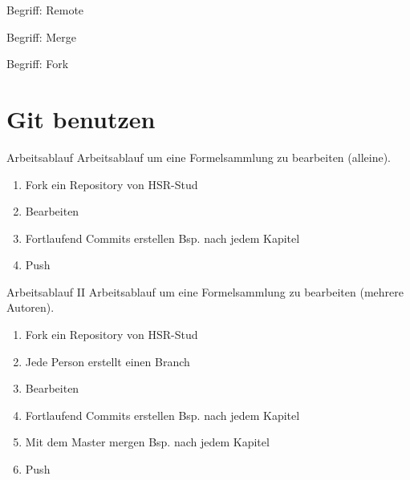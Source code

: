 \begin{frame}{Begriff: Remote}
\end{frame}

\begin{frame}{Begriff: Merge}
\end{frame}

\begin{frame}{Begriff: Fork}
\end{frame}

\section{Git benutzen}



\begin{frame}{Arbeitsablauf}
	Arbeitsablauf um eine Formelsammlung zu bearbeiten (alleine).
	\begin{enumerate}
		\item Fork ein Repository von HSR-Stud \pause
		\item Bearbeiten \pause
		\item Fortlaufend Commits erstellen Bsp. nach jedem Kapitel \pause
		\item Push
	\end{enumerate}
	
\end{frame}

\begin{frame}{Arbeitsablauf II}
Arbeitsablauf um eine Formelsammlung zu bearbeiten (mehrere Autoren).
\begin{enumerate}
	\item Fork ein Repository von HSR-Stud  \pause
	\item Jede Person erstellt einen Branch \pause
	\item Bearbeiten \pause
	\item Fortlaufend Commits erstellen Bsp. nach jedem Kapitel \pause
	\item Mit dem Master mergen Bsp. nach jedem Kapitel \pause
	\item Push
\end{enumerate}

\end{frame}
